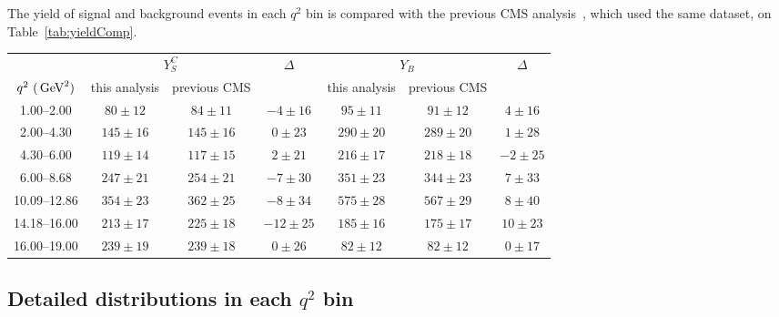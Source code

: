 The yield of signal and background events in each $q^2$ bin is compared with the previous CMS analysis~\cite{AN-14-129}, which used the same dataset, on Table~\ref{tab:yieldComp}.

\begin{table*}[!htb]
  \begin{center}
    \begin{footnotesize}
      \caption{Comparison of values of signal yield $Y^{C}_{S}$ and background yield $Y_{B}$ with the same values found in previous CMS analysis.\label{tab:yieldComp}}
      \begin{tabular}{c|ccc|ccc}
        \hline
        & \multicolumn{2}{c}{$Y^{C}_{S}$} & $\Delta$  & \multicolumn{2}{c}{$Y_{B}$} & $\Delta$ \\
        $q^2~(\,\textrm{GeV}^2)$      & this analysis & previous CMS & & this analysis & previous CMS &\\
        \hline         
        1.00--2.00     & $80  \pm 12$ & $ 84 \pm 11$ & $-4\pm16$  &   $ 95\pm 11$    & $ 91 \pm 12$ & $4  \pm 16$\\
        2.00--4.30     & $145 \pm 16$ & $145 \pm 16$ & $0\pm23$   &   $290\pm 20$    & $289 \pm 20$ & $1  \pm 28$\\
        4.30--6.00     & $119 \pm 14$ & $117 \pm 15$ & $2\pm21$   &   $216\pm 17$    & $218 \pm 18$ & $-2 \pm 25$\\
        6.00--8.68     & $247 \pm 21$ & $254 \pm 21$ & $-7\pm30$  &   $351\pm 23$    & $344 \pm 23$ & $7  \pm 33$\\
        10.09--12.86   & $354 \pm 23$ & $362 \pm 25$ & $-8\pm34$  &   $575\pm 28$    & $567 \pm 29$ & $8  \pm 40$\\
        14.18--16.00   & $213 \pm 17$ & $225 \pm 18$ & $-12\pm25$ &   $185\pm 16$    & $175 \pm 17$ & $10 \pm 23$\\
        16.00--19.00   & $239 \pm 19$ & $239 \pm 18$ & $0\pm26$   &   $ 82\pm 12$    & $ 82 \pm 12$ & $0  \pm 17$\\

        \hline
      \end{tabular}
    \end{footnotesize}
  \end{center}
\end{table*}



\clearpage

\subsection{Detailed distributions in each $q^2$ bin}
\label{sec:res-proj}


